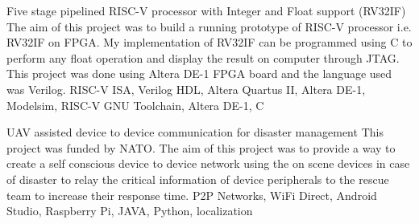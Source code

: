 %
%
%


\begin{projects}
	\project
	{Five stage pipelined RISC-V processor with Integer and Float support (RV32IF)}{}
	{ {}{} }
	{The aim of this project was to build a running prototype of RISC-V processor i.e. RV32IF on FPGA. My implementation of RV32IF can be programmed using C to perform any float operation and display the result on computer through JTAG. This project was done using Altera DE-1 FPGA board and the language used was Verilog.}
	{RISC-V ISA, Verilog HDL, Altera Quartus II, Altera DE-1, Modelsim, RISC-V GNU Toolchain, Altera DE-1, C}
			
  \emptySeparator
  
	\project
	{UAV assisted device to device communication for disaster management}{}
	{ }
	{This project was funded by NATO. The aim of this project was to provide a way to create a self conscious device to device network using the on scene devices in case of disaster to relay the critical information of device peripherals to the rescue team to increase their response time.}
	{P2P Networks, WiFi Direct, Android Studio, Raspberry Pi, JAVA, Python, localization}	
	
  \emptySeparator
  
	
  
	
  
	

\end{projects}
